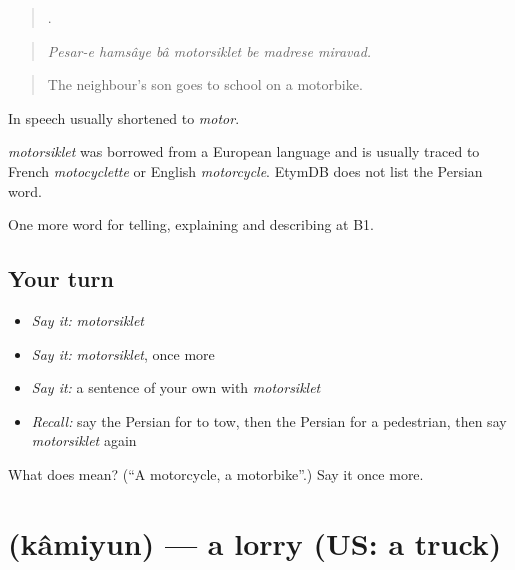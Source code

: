 \begin{quote}
      .
\end{quote}

\begin{quote}
\emph{Pesar-e hamsâye bâ motorsiklet be madrese miravad.}
\end{quote}

\begin{quote}
The neighbour's son goes to school on a motorbike.
\end{quote}

In speech usually shortened to \emph{motor}.

\begin{cousinweb}
\emph{motorsiklet} was borrowed from a European language and is usually traced to French \emph{motocyclette} or English \emph{motorcycle}. EtymDB does not list the Persian word.
\end{cousinweb}

\begin{grammarlens}[title={What you've built}]
One more word for telling, explaining and describing at B1.
\end{grammarlens}

\subsection*{Your turn}
\begin{itemize}
\raggedright
  \item \emph{Say it:} \emph{motorsiklet}
  \item \emph{Say it:} \emph{motorsiklet}, once more
  \item \emph{Say it:} a sentence of your own with \emph{motorsiklet}
  \item \emph{Recall:} say the Persian for to tow, then the Persian for a pedestrian, then say \emph{motorsiklet} again
\end{itemize}

\begin{tcolorbox}[breakable,colback=teal!4,colframe=teal!35!black,title={Before you move on}]
What does  mean? (\textquotedblleft{}A motorcycle, a motorbike\textquotedblright{}.) Say it once more.
\end{tcolorbox}
\section[\texorpdfstring{\fa{کامیون} (kâmiyun)}{کامیون (kâmiyun)}]{ (kâmiyun) — a lorry (US: a truck)}

